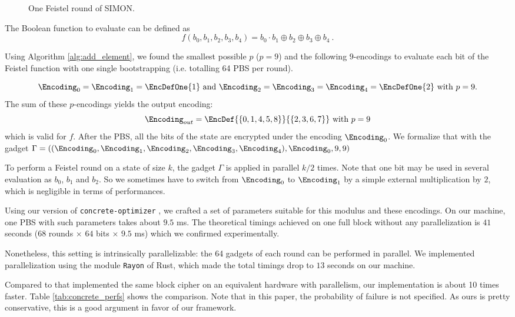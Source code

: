 \begin{figure}
    \centering
    
    \caption{One Feistel round of SIMON. }     
    \label{fig:simon_cipher}
\end{figure}


The Boolean function to evaluate can be defined as $$f(b_0, b_1, b_2, b_3, b_4) = b_0 \cdot b_1 \oplus b_2 \oplus b_3 \oplus b_4~.$$


Using Algorithm \ref{alg:add_element}, we found the smallest possible $p$ ($p = 9$) and the following $9$-encodings to evaluate each bit of the Feistel function with one single bootstrapping (i.e. totalling 64 PBS per round). 


\[\Encoding_0 = \Encoding_1 = \EncDefOne{1} \text{ and } \Encoding_2 = \Encoding_3 = \Encoding_4 = \EncDefOne{2} \text{ with } p = 9.\] The sum of these $p$-encodings yields the output encoding: \[\Encoding_{out} = \EncDef{\{0, 1, 4, 5, 8\}}{\{2, 3, 6, 7\}} \text{ with } p=9\] which is valid for $f$. After the PBS, all the bits of the state are encrypted under the encoding $\Encoding_0$. We formalize that with the gadget $\Gamma = \left ((\Encoding_0, \Encoding_1, \Encoding_2, \Encoding_3, \Encoding_4), \Encoding_0, 9, 9\right )$


To perform a Feistel round on a state of size $k$, the gadget $\Gamma$ is applied in parallel $k / 2$ times. Note that one bit may be used in several evaluation as $b_0$, $b_1$ and $b_2$. So we sometimes have to switch from $\Encoding_0$ to $\Encoding_1$ by a simple external multiplication by $2$, which is negligible in terms of performances.


Using our version of \texttt{concrete-optimizer} \cite{concrete-optimizer}, we crafted a set of parameters suitable for this modulus and these encodings. 
On our machine, one PBS with such parameters takes about $9.5$ ms. The theoretical timings achieved on one full block without any parallelization is $41$ seconds ($68$ rounds $\times$ $64$ bits $\times$ $9.5$ ms)  which we confirmed experimentally.


Nonetheless, this setting is intrinsically parallelizable: the 64 gadgets of each round can be performed in parallel. We implemented parallelization using the module \texttt{Rayon} of Rust, which made the total timings drop to $13$ seconds on our machine. 

Compared to \cite{cryptoeprint:2023/480} that implemented the same block cipher on an equivalent hardware with parallelism, our implementation is about 10 times faster. Table \ref{tab:concrete_perfs} shows the comparison. Note that in this paper, the probability of failure is not specified. As ours is pretty conservative, this is a good argument in favor of our framework.


